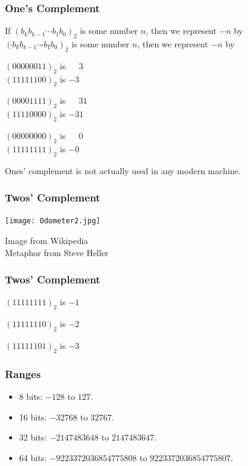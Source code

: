 \begin{frame}[fragile]
\frametitle{One's Complement}

If $(b_k b_{k-1}\cdots b_1 b_0)_2$ is some number $n$, then we represent $-n$ by\\
$(\tilde{}b_k \tilde{}b_{k-1}\cdots \tilde{} b_1 \tilde{} b_0)_2$ is some number $n$, then we represent $-n$ by

\pause

\bigskip
$(00000011)_2$ is $\phantom{-}3$\\
$(11111100)_2$ is $-3$

\bigskip

$(00001111)_2$ is $\phantom{-}31$\\
$(11110000)_2$ is $-31$

\bigskip

\pause
$(00000000)_2$ is $\phantom{-}0$\\
$(11111111)_2$ is $-0$

\pause
\bigskip

Ones' complement is not actually used in any modern machine.

\end{frame}

\begin{frame}[fragile]
\frametitle{Twos' Complement}

\centering
\texttt{[image: Odometer2.jpg]}

\begin{flushright}
Image from Wikipedia\\
Metaphor from Steve Heller
\end{flushright}
\end{frame}

\begin{frame}[fragile]
\frametitle{Twos' Complement}

$(11111111)_2$ is $-1$

$(11111110)_2$ is $-2$

$(11111101)_2$ is $-3$

\end{frame}

\begin{frame}[fragile]
\frametitle{Ranges}

\begin{itemize}
\item 8 bits: $-128$ to $127$.
\item 16 bits: $-32768$ to $32767$.
\item 32 bits: $-2147483648$ to $2147483647$.
\item 64 bits: $-9223372036854775808$ to $9223372036854775807$.
\end{itemize}
\end{frame}

